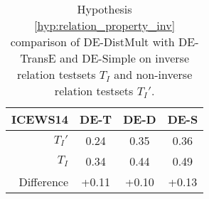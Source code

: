 \begin{table}[htb]
\centering
\begin{minipage}{\columnwidthcaption}
\centering
\caption{Hypothesis \autoref{hyp:relation_property_inv} comparison of DE-DistMult with DE-TransE and DE-Simple on inverse relation testsets $T_I$ and non-inverse relation testsets $T_I'$.}
\vspace{-3mm}

\begin{tabular}{r|ccc}\hline
ICEWS14 & DE-T & DE-D & DE-S \\ \hline
$T_I'$ & 0.24 & 0.35 & 0.36 \\
$T_I$ & 0.34 & 0.44 & 0.49 \\ \hline
Difference & +0.11 & +0.10 & +0.13 \\
 \hline
\end{tabular}

\label{tab:hypothesis_3_c_comparison}
\end{minipage}
\end{table}

